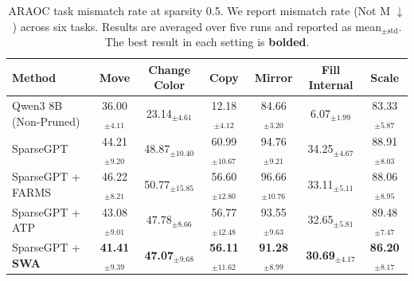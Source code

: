 \begin{table}[t]
\centering
\scriptsize
\setlength{\tabcolsep}{6pt}

\caption{\small ARAOC task mismatch rate at sparsity 0.5. We report mismatch rate (Not M $\downarrow$) across six tasks. Results are averaged over five runs and reported as mean$_{\pm \text{std}}$. The best result in each setting is \colorbox{gray!15}{\textbf{bolded}}.}

\begin{tabular}{l|cccccc}
\toprule
\textbf{Method} 
& \textbf{Move} 
& \textbf{Change Color} 
& \textbf{Copy} 
& \textbf{Mirror} 
& \textbf{Fill Internal} 
& \textbf{Scale} \\
\midrule

Qwen3 8B (Non-Pruned) 
& 36.00$_{\scriptstyle \pm 4.11}$
& 23.14$_{\scriptstyle \pm 4.61}$
& 12.18$_{\scriptstyle \pm 4.12}$
& 84.66$_{\scriptstyle \pm 3.20}$
& 6.07$_{\scriptstyle \pm 1.99}$
& 83.33$_{\scriptstyle \pm 5.87}$ \\
\midrule

SparseGPT 
& 44.21$_{\scriptstyle \pm 9.20}$
& 48.87$_{\scriptstyle \pm 10.40}$
& 60.99$_{\scriptstyle \pm 10.67}$
& 94.76$_{\scriptstyle \pm 9.21}$
& 34.25$_{\scriptstyle \pm 4.67}$
& 88.91$_{\scriptstyle \pm 8.03}$ \\

SparseGPT + FARMS 
& 46.22$_{\scriptstyle \pm 8.21}$
& 50.77$_{\scriptstyle \pm 15.85}$
& 56.60$_{\scriptstyle \pm 12.80}$
& 96.66$_{\scriptstyle \pm 10.76}$
& 33.11$_{\scriptstyle \pm 5.11}$
& 88.06$_{\scriptstyle \pm 8.95}$ \\

SparseGPT + ATP 
& 43.08$_{\scriptstyle \pm 9.01}$
& 47.78$_{\scriptstyle \pm 8.66}$
& 56.77$_{\scriptstyle \pm 12.48}$
& 93.55$_{\scriptstyle \pm 9.63}$
& 32.65$_{\scriptstyle \pm 5.81}$
& 89.48$_{\scriptstyle \pm 7.47}$ \\

SparseGPT + \textbf{SWA} 
& \cellcolor{gray!15}\textbf{41.41$_{\scriptstyle \pm 9.39}$}
& \cellcolor{gray!15}\textbf{47.07$_{\scriptstyle \pm 9.68}$}
& \cellcolor{gray!15}\textbf{56.11$_{\scriptstyle \pm 11.62}$}
& \cellcolor{gray!15}\textbf{91.28$_{\scriptstyle \pm 8.99}$}
& \cellcolor{gray!15}\textbf{30.69$_{\scriptstyle \pm 4.17}$}
& \cellcolor{gray!15}\textbf{86.20$_{\scriptstyle \pm 8.17}$} \\

\bottomrule
\end{tabular}
\vspace{-0.5cm}

\label{tab:araoc_split}
\end{table}